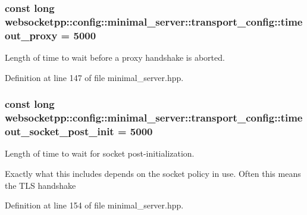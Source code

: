\subsubsection[{timeout\+\_\+proxy}]{\setlength{\rightskip}{0pt plus 5cm}const long websocketpp\+::config\+::minimal\+\_\+server\+::transport\+\_\+config\+::timeout\+\_\+proxy = 5000\hspace{0.3cm}{\ttfamily [static]}}\label{structwebsocketpp_1_1config_1_1minimal__server_1_1transport__config_a1082d008bb545885253eaff90fcd58f6}


Length of time to wait before a proxy handshake is aborted. 



Definition at line 147 of file minimal\+\_\+server.\+hpp.

\hypertarget{structwebsocketpp_1_1config_1_1minimal__server_1_1transport__config_a8ff9307f4d8d33cd07c8d94afed18ca5}{}
\subsubsection[{timeout\+\_\+socket\+\_\+post\+\_\+init}]{\setlength{\rightskip}{0pt plus 5cm}const long websocketpp\+::config\+::minimal\+\_\+server\+::transport\+\_\+config\+::timeout\+\_\+socket\+\_\+post\+\_\+init = 5000\hspace{0.3cm}{\ttfamily [static]}}\label{structwebsocketpp_1_1config_1_1minimal__server_1_1transport__config_a8ff9307f4d8d33cd07c8d94afed18ca5}


Length of time to wait for socket post-\/initialization. 

Exactly what this includes depends on the socket policy in use. Often this means the T\+L\+S handshake 

Definition at line 154 of file minimal\+\_\+server.\+hpp.

\hypertarget{structwebsocketpp_1_1config_1_1minimal__server_1_1transport__config_abe0f95c0e47d16ff3b316910fed6e5f1}{}
